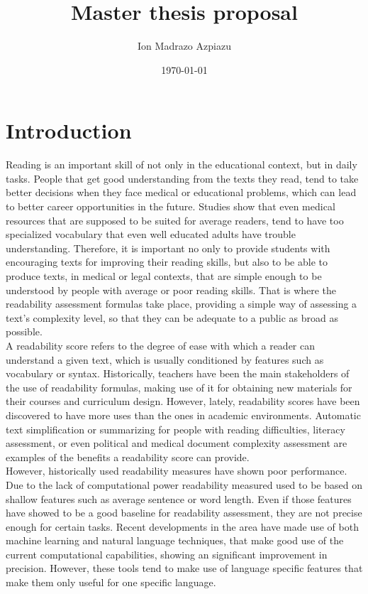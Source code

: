 \documentclass[12pt]{article}
\title{Master thesis proposal}
\author{Ion Madrazo Azpiazu}
\date{\today}
\begin{document}
\maketitle
\section{Introduction}

Reading is an important skill of not only in the educational context, but in daily tasks. People that get good understanding from the texts they read, tend to take better decisions when they face medical or educational problems, which can lead to better career opportunities in the future. Studies\cite{medicalReadability1} show that even medical resources that are supposed to be suited for average readers, tend to have too specialized vocabulary that even well educated adults have trouble understanding. Therefore, it is important no only to provide students with encouraging texts for improving their reading skills, but also to be able to produce texts, in medical or legal contexts, that are simple enough to be understood by people with average or poor reading skills.  That is where the readability assessment formulas take place, providing a simple way of assessing a text's complexity level, so that they can be adequate to a public as broad as possible. \\


A readability score refers to the degree of ease with which a reader can understand a given text, which is usually conditioned by features such as vocabulary or syntax. Historically, teachers have been the main stakeholders of the use of readability formulas, making use of it for obtaining new materials for their courses and curriculum design. However, lately, readability scores have been discovered to have more uses than the ones in academic environments. Automatic text simplification or summarizing for people with reading difficulties, literacy assessment, or even political and medical document complexity assessment are examples of the benefits a readability score can provide.\\

However, historically used readability measures have shown poor performance. Due to the lack of computational power readability measured used to be based on shallow features such as average sentence or word length. Even if those features have showed to be a good baseline for readability assessment, they are not precise enough for certain tasks. Recent developments in the area have made use of both machine learning and natural language techniques, that make good use of the current computational capabilities, showing an significant improvement in precision. However, these tools tend to make use of language specific features that make them only useful for one specific language.\\
\end{document}
